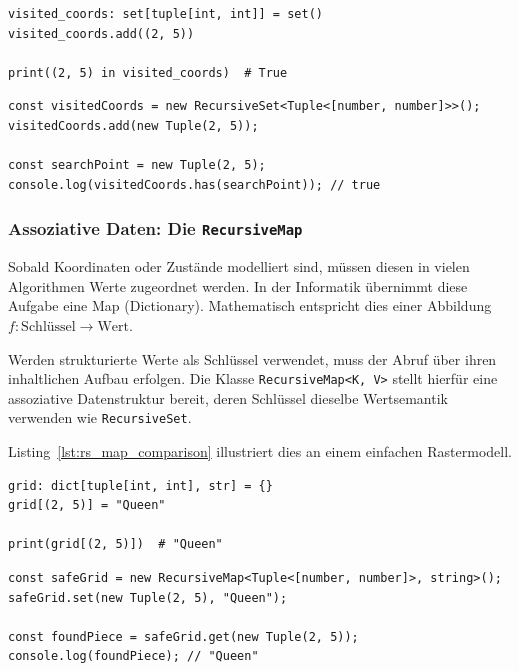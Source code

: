 \begin{listing}[ht]
    \caption{Roboter-Koordinaten: Tupel in Python vs. TypeScript}
    \label{lst:rs_tuple_comparison}
    \begin{verbatim}
visited_coords: set[tuple[int, int]] = set()
visited_coords.add((2, 5))

print((2, 5) in visited_coords)  # True
    \end{verbatim}
    
    
    
    \begin{verbatim}
const visitedCoords = new RecursiveSet<Tuple<[number, number]>>();
visitedCoords.add(new Tuple(2, 5));

const searchPoint = new Tuple(2, 5);
console.log(visitedCoords.has(searchPoint)); // true
    \end{verbatim}
\end{listing}

\subsubsection{Assoziative Daten: Die \texttt{RecursiveMap}}
\label{subsubsec:rs-api-map}

Sobald Koordinaten oder Zustände modelliert sind, müssen diesen in vielen Algorithmen Werte zugeordnet werden. In der Informatik übernimmt diese Aufgabe eine Map (Dictionary). Mathematisch entspricht dies einer Abbildung \(f \colon \text{Schlüssel} \to \text{Wert}\).

Werden strukturierte Werte als Schlüssel verwendet, muss der Abruf über ihren inhaltlichen Aufbau erfolgen. Die Klasse \texttt{RecursiveMap<K, V>} stellt hierfür eine assoziative Datenstruktur bereit, deren Schlüssel dieselbe Wertsemantik verwenden wie \texttt{RecursiveSet}.

Listing~\ref{lst:rs_map_comparison} illustriert dies an einem einfachen Rastermodell.

\begin{listing}[ht]
    \caption{Dictionaries in Python vs. \texttt{RecursiveMap} in TypeScript}
    \label{lst:rs_map_comparison}
    \begin{verbatim}
grid: dict[tuple[int, int], str] = {}
grid[(2, 5)] = "Queen"

print(grid[(2, 5)])  # "Queen"
    \end{verbatim}
    
    
    
    \begin{verbatim}
const safeGrid = new RecursiveMap<Tuple<[number, number]>, string>();
safeGrid.set(new Tuple(2, 5), "Queen");

const foundPiece = safeGrid.get(new Tuple(2, 5));
console.log(foundPiece); // "Queen"
    \end{verbatim}
\end{listing}



